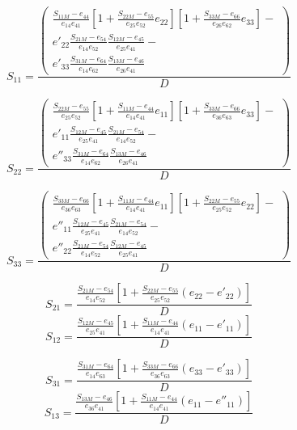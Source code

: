 \begin{equation}
S_{11}=
	\frac{
	\left(\begin{split}
	\frac{S_{11M}-e_{44}}{e_{14}e_{41}}
	\left[ 1+\frac{S_{22M}-e_{55}}{e_{25}e_{52}}e_{22}\right]
	\left[ 1+\frac{S_{33M}-e_{66}}{e_{26}e_{62}}e_{33}\right]-\\
	e'_{22}\frac{S_{21M}-e_{54}}{e_{14}e_{52}}\frac{S_{12M}-e_{45}}{e_{25}e_{41}}-\\
	e'_{33}\frac{S_{31M}-e_{64}}{e_{14}e_{62}}\frac{S_{13M}-e_{46}}{e_{26}e_{41}}	
	\end{split}\right)
	} {D}
\end{equation}

\begin{equation}
S_{22}=
\frac{
	\left(\begin{split}
	\frac{S_{22M}-e_{55}}{e_{25}e_{52}}
	\left[ 1+\frac{S_{11M}-e_{44}}{e_{14}e_{41}}e_{11}\right]
	\left[ 1+\frac{S_{33M}-e_{66}}{e_{36}e_{63}}e_{33}\right]-\\
	e'_{11}\frac{S_{12M}-e_{45}}{e_{25}e_{41}}\frac{S_{21M}-e_{54}}{e_{14}e_{52}}-\\
	e''_{33}\frac{S_{31M}-e_{64}}{e_{14}e_{62}}\frac{S_{13M}-e_{46}}{e_{26}e_{41}}	
	\end{split}\right)
} {D}
\end{equation}

\begin{equation}
S_{33}=
\frac{
	\left(\begin{split}
	\frac{S_{33M}-e_{66}}{e_{36}e_{63}}
	\left[ 1+\frac{S_{11M}-e_{44}}{e_{14}e_{41}}e_{11}\right]
	\left[ 1+\frac{S_{22M}-e_{55}}{e_{25}e_{52}}e_{22}\right]-\\
	e''_{11}\frac{S_{12M}-e_{45}}{e_{25}e_{41}}\frac{S_{21M}-e_{54}}{e_{14}e_{52}}-\\	
	e''_{22}\frac{S_{21M}-e_{54}}{e_{14}e_{52}}\frac{S_{12M}-e_{45}}{e_{25}e_{41}}
	\end{split}\right)
} {D}
\end{equation}

\begin{equation}
S_{21} = \frac{\frac{S_{21M}-e_{54}}{e_{14}e_{52}}\left[1+\frac{S_{22M}-e_{55}}{e_{25}e_{52}}(e_{22}-e'_{22})\right]}{D}
\end{equation}
\begin{equation}
S_{12} = \frac{\frac{S_{12M}-e_{45}}{e_{25}e_{41}}\left[1+\frac{S_{11M}-e_{44}}{e_{14}e_{41}}(e_{11}-e'_{11})\right]}{D}
\end{equation}

\begin{equation}
S_{31} = \frac{\frac{S_{31M}-e_{64}}{e_{14}e_{63}}\left[1+\frac{S_{33M}-e_{66}}{e_{36}e_{63}}(e_{33}-e'_{33})\right]}{D}
\end{equation}
\begin{equation}
S_{13} = \frac{\frac{S_{13M}-e_{46}}{e_{36}e_{41}}\left[1+\frac{S_{11M}-e_{44}}{e_{14}e_{41}}(e_{11}-e''_{11})\right]}{D}
\end{equation}

